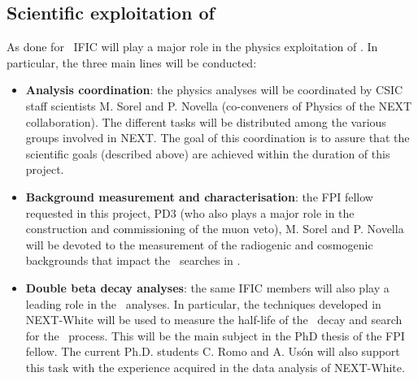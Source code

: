 

\subsection*{Scientific exploitation of \Next}

As done for \NEW\, IFIC will play a major role in the physics exploitation of \Next. In particular, the three main lines will be conducted: 

\begin{itemize}[noitemsep,topsep=0pt,parsep=0pt,partopsep=0pt]
    \item {\bf Analysis coordination}: the physics analyses will be coordinated by CSIC staff scientists M. Sorel and P. Novella (co-conveners of Physics of the NEXT collaboration). The different tasks will be distributed among the various groups involved in NEXT. The goal of this coordination is to assure that the scientific goals (described above) are achieved within the duration of this project. 
    \item {\bf Background measurement and characterisation}: the FPI fellow requested in this project, PD3 (who also plays a major role in the construction and commissioning of the muon veto), M. Sorel and P. Novella will be devoted to the measurement of the radiogenic and cosmogenic backgrounds that impact the \bb\ searches in \Next. 
    \item {\bf Double beta decay analyses}: the same IFIC members will also play a leading role in the \bb\ analyses. In particular, the techniques developed in NEXT-White will be used to measure the half-life of the \bbtnu\ decay and search for the \bbonu\ process. This will be the main subject in the PhD thesis of the FPI fellow. The current Ph.D. students C. Romo and A. Us\'on will also support this task with the experience acquired in the data analysis of NEXT-White.  
\end{itemize}


